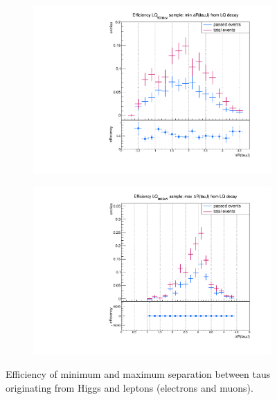 \begin{figure}
\begin{subfigure}[t]{0.49\textwidth}
                \label{dRFromLQ:signal:taulepton:maxLQ75}
                \end{subfigure}
                \begin{subfigure}[t]{0.49\textwidth}
                \includegraphics[width=\textwidth]{figures/plots/LQ76/Divided_fromLQ_mindR_taulepton.pdf}
                \label{dRFromLQ:signal:taulepton:minLQ76}
                \end{subfigure}
                \begin{subfigure}[t]{0.49\textwidth}
                \includegraphics[width=\textwidth]{figures/plots/LQ76/Divided_maxdR_fromLQ_taulepton.pdf}
                \label{dRFromLQ:signal:taulepton:maxLQ76}
                \end{subfigure}
\caption[Efficiency of separation between taus originating from Higgs and leptons.]{Efficiency of minimum and maximum separation between taus originating from Higgs and leptons (electrons and muons).}
\label{dRFromLQ:signal:taulepton}
\end{figure}
